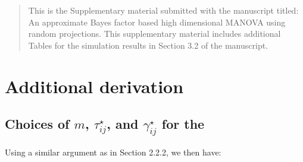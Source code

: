\documentclass[]{article}
\def\Normal{\hbox{Normal}}
\def\Normal{\hbox{Normal}}
\def\Invwish{\hbox{Inv-Wishart}}
\begin{document}
\baselineskip=16pt
\vspace{1in}

\begin{abstract}
This is the Supplementary material submitted with the manuscript titled: An approximate Bayes factor based high dimensional MANOVA using random projections. This supplementary material includes additional Tables for the simulation results in Section 3.2 of the manuscript. 
\end{abstract}

\section{Additional derivation}

\subsection{Choices of $m$, $\tau^{\star}_{ij}$, and $\gamma^{\star}_{ij}$ for the }

Using a similar argument as in Section 2.2.2, we then have: 
\end{document}
